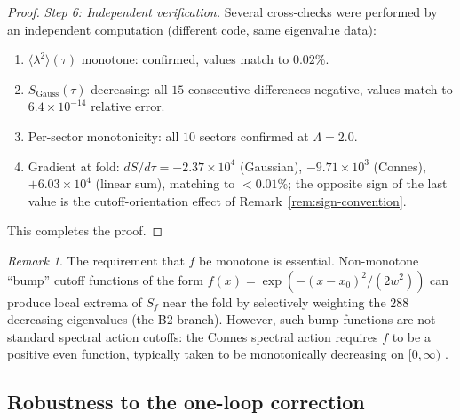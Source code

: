 \documentclass[12pt]{article}
\theoremstyle{definition}
\theoremstyle{remark}
\newtheorem{remark}[theorem]{Remark}
\begin{document}
\begin{proof}
\medskip\noindent\textit{Step 6: Independent verification.}
Several cross-checks were performed by an independent computation
(different code, same eigenvalue data):
\begin{enumerate}
\item $\langle\lambda^2\rangle(\tau)$ monotone: confirmed, values
  match to $0.02\%$.
\item $S_{\mathrm{Gauss}}(\tau)$ decreasing: all $15$ consecutive
  differences negative, values match to $6.4 \times 10^{-14}$ relative
  error.
\item Per-sector monotonicity: all $10$ sectors confirmed at
  $\Lambda = 2.0$.
\item Gradient at fold: $dS/d\tau = -2.37\times 10^{4}$ (Gaussian),
  $-9.71\times 10^{3}$ (Connes), $+6.03\times 10^{4}$ (linear sum),
  matching to $< 0.01\%$; the opposite sign of the last value is the
  cutoff-orientation effect of Remark~\ref{rem:sign-convention}.
\end{enumerate}
This completes the proof.
\end{proof}

\begin{remark}\label{rem:non-monotone-cutoff}
The requirement that $f$ be monotone is essential.  Non-monotone
``bump'' cutoff functions of the form $f(x) = \exp(-(x-x_0)^2/(2w^2))$
can produce local extrema of $S_f$ near the fold by selectively
weighting the $288$ decreasing eigenvalues (the B2 branch).  However,
such bump functions are not standard spectral action cutoffs: the
Connes spectral action requires $f$ to be a positive even function,
typically taken to be monotonically decreasing on $[0,\infty)$
\cite{Chamseddine1997, Connes2019}.
\end{remark}


\subsection{Robustness to the one-loop correction}
\label{subsec:oneloop}
\end{document}
